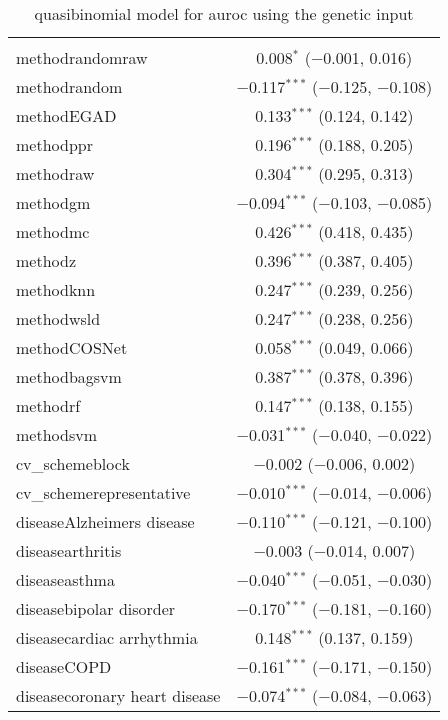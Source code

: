 
\begin{table}[!htbp] \centering 
  \caption{quasibinomial model for auroc using the genetic input} 
  \label{} 
\begin{tabular}{@{\extracolsep{5pt}}lc} 
\\[-1.8ex]\hline 
\hline \\[-1.8ex] 
 methodrandomraw & 0.008$^{*}$ ($-$0.001, 0.016) \\ 
  methodrandom & $-$0.117$^{***}$ ($-$0.125, $-$0.108) \\ 
  methodEGAD & 0.133$^{***}$ (0.124, 0.142) \\ 
  methodppr & 0.196$^{***}$ (0.188, 0.205) \\ 
  methodraw & 0.304$^{***}$ (0.295, 0.313) \\ 
  methodgm & $-$0.094$^{***}$ ($-$0.103, $-$0.085) \\ 
  methodmc & 0.426$^{***}$ (0.418, 0.435) \\ 
  methodz & 0.396$^{***}$ (0.387, 0.405) \\ 
  methodknn & 0.247$^{***}$ (0.239, 0.256) \\ 
  methodwsld & 0.247$^{***}$ (0.238, 0.256) \\ 
  methodCOSNet & 0.058$^{***}$ (0.049, 0.066) \\ 
  methodbagsvm & 0.387$^{***}$ (0.378, 0.396) \\ 
  methodrf & 0.147$^{***}$ (0.138, 0.155) \\ 
  methodsvm & $-$0.031$^{***}$ ($-$0.040, $-$0.022) \\ 
  cv\_schemeblock & $-$0.002 ($-$0.006, 0.002) \\ 
  cv\_schemerepresentative & $-$0.010$^{***}$ ($-$0.014, $-$0.006) \\ 
  diseaseAlzheimers disease & $-$0.110$^{***}$ ($-$0.121, $-$0.100) \\ 
  diseasearthritis & $-$0.003 ($-$0.014, 0.007) \\ 
  diseaseasthma & $-$0.040$^{***}$ ($-$0.051, $-$0.030) \\ 
  diseasebipolar disorder & $-$0.170$^{***}$ ($-$0.181, $-$0.160) \\ 
  diseasecardiac arrhythmia & 0.148$^{***}$ (0.137, 0.159) \\ 
  diseaseCOPD & $-$0.161$^{***}$ ($-$0.171, $-$0.150) \\ 
  diseasecoronary heart disease & $-$0.074$^{***}$ ($-$0.084, $-$0.063) \\ 

\end{tabular}
\end{table}
